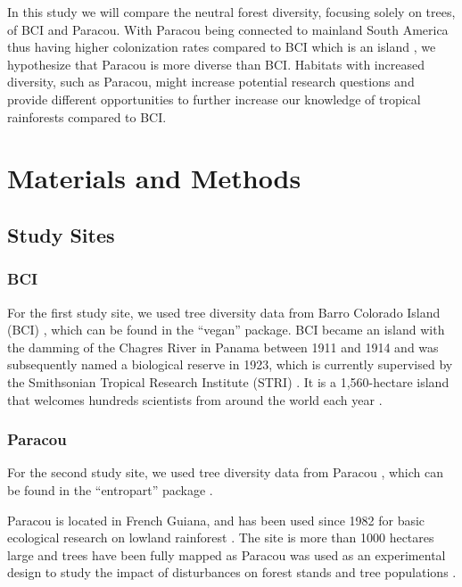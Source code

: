 \documentclass[fleqn,10pt]{ArtEcoFoG} %
\begin{document}
In this study we will compare the neutral forest diversity, focusing
solely on trees, of BCI and Paracou. With Paracou being connected to
mainland South America thus having higher colonization rates compared to
BCI which is an island \citep{BRV:BRV510}, we hypothesize that Paracou
is more diverse than BCI. Habitats with increased diversity, such as
Paracou, might increase potential research questions and provide
different opportunities to further increase our knowledge of tropical
rainforests compared to BCI.

\section{Materials and Methods}\label{materials-and-methods}

\subsection{Study Sites}\label{study-sites}

\subsubsection{BCI}\label{bci}

For the first study site, we used tree diversity data from Barro
Colorado Island (BCI) \citep{croat1978flora}, which can be found in the
``vegan'' package\citep{oksanen2010vegan}. BCI became an island with the
damming of the Chagres River in Panama between 1911 and 1914 and was
subsequently named a biological reserve in 1923, which is currently
supervised by the Smithsonian Tropical Research Institute (STRI)
\citep{croat1978flora, leigh1999tropical}. It is a 1,560-hectare island
that welcomes hundreds scientists from around the world each year
\citep{croat1978flora}.

\subsubsection{Paracou}\label{paracou}

For the second study site, we used tree diversity data from Paracou
\citep{Degen2006}, which can be found in the ``entropart'' package
\citep{Marcon2014c}.

Paracou is located in French Guiana, and has been used since 1982 for
basic ecological research on lowland rainforest
\citep{Gourlet-Fleury2004}. The site is more than 1000 hectares large
and trees have been fully mapped as Paracou was used as an experimental
design to study the impact of disturbances on forest stands and tree
populations \citep{Gourlet-Fleury2004}.
\end{document}

